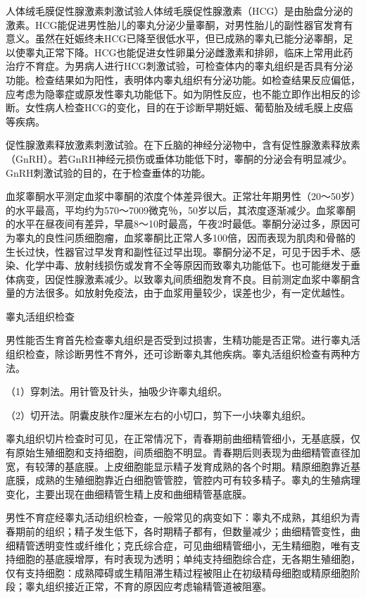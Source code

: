\documentclass[12pt,UTF8,openany]{ctexbook}
\begin{document}
人体绒毛膜促性腺激素刺激试验人体绒毛膜促性腺激素（HCG）是由胎盘分泌的激素。HCG能促进男性胎儿的睾丸分泌少量睾酮，对男性胎儿的副性器官发育有意义。虽然在妊娠终未HCG已降至很低水平，但已成熟的睾丸已能分泌睾酮，足以使睾丸正常下降。HCG也能促进女性卵巢分泌雌激素和排卵，临床上常用此药治疗不育症。为男病人进行HCG刺激试验，可检查体内的睾丸组织是否具有分泌功能。检查结果如为阳性，表明体内睾丸组织有分泌功能。如检查结果反应偏低，应考虑为隐睾症或原发性睾丸功能低下。如为阴性反应，也不能立即作出相反的诊断。女性病人检查HCG的变化，目的在于诊断早期妊娠、葡萄胎及绒毛膜上皮癌等疾病。

促性腺激素释放激素刺激试验。在下丘脑的神经分泌物中，含有促性腺激素释放素（GnRH）。若GnRH神经元损伤或垂体功能低下时，睾酮的分泌会有明显减少。GnRH刺激试验的目的，在于检查垂体的功能。

血浆睾酮水平测定血浆中睾酮的浓度个体差异很大。正常壮年期男性（20～50岁）的水平最高，平均约为570～7009微克％，50岁以后，其浓度逐渐减少。血浆睾酮的水平在昼夜间有差异，早晨8～10时最高，午夜2时最低。睾酮分泌过多，原因可为睾丸的良性问质细胞瘤，血浆睾酮比正常人多100倍，因而表现为肌肉和骨骼的生长过快，性器官过早发育和副性征过早出现。睾酮分泌不足，可见于因手术、感染、化学中毒、放射线损伤或发育不全等原因而致睾丸功能低下。也可能继发于垂体病变，因促性腺激素减少。以致睾丸间质细胞发育不良。目前测定血浆中睾酮含量的方法很多。如放射免疫法，由于血浆用量较少，误差也少，有一定优越性。

睾丸活组织检查

男性能否生育首先检查睾丸组织是否受到过损害，生精功能是否正常。进行睾丸活组织检查，除诊断男性不育外，还可诊断睾丸其他疾病。睾丸活组织检查有两种方法。

（1）穿刺法。用针管及针头，抽吸少许睾丸组织。

（2）切开法。阴囊皮肤作2厘米左右的小切口，剪下一小块睾丸组织。

睾丸组织切片检查时可见，在正常情况下，青春期前曲细精管细小，无基底膜，仅有原始生殖细胞和支持细胞，间质细胞不明显。青春期后则表现为曲细精管直径加宽，有较薄的基底膜。上皮细胞能显示精子发育成熟的各个时期。精原细胞靠近基底膜，成熟的生殖细胞靠近白细胞管管腔，管腔内可有较多精子。睾丸的生殖病理变化，主要出现在曲细精管生精上皮和曲细精管基底膜。

男性不育症经睾丸活动组织检查，一般常见的病变如下：睾丸不成熟，其组织为青春期前的组织；精子发生低下，各时期精子都有，但数量减少；曲细精管变性，曲细精管透明变性或纤维化；克氏综合症，可见曲细精管细小，无生精细胞，唯有支持细胞的基底膜增厚，有时表现为透明；单纯支持细胞综合症，无各期生殖细胞，仅有支持细胞：成熟障碍或生精阻滞生精过程被阻止在初级精母细胞或精原细胞阶段；睾丸组织接近正常，不育的原因应考虑输精管道被阻塞。
\end{document}

